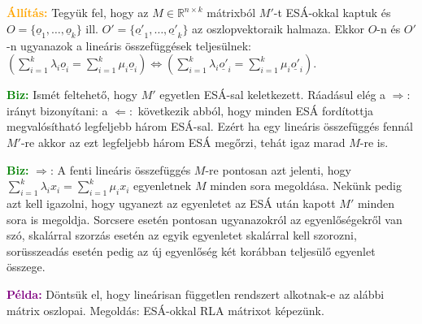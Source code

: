 \documentclass[../szamtud.tex]{subfiles}
\begin{document}
        \textcolor{orange}{\textbf{Állítás:}} Tegyük fel, hogy az $M \in \mathbb{R}^{n \times k}$ mátrixból $M'$-t ESÁ-okkal kaptuk és $O = \{\underline{o}_1, \dots, \underline{o}_k\}$ ill. $O' = \{\underline{o'}_1, \dots, \underline{o'}_k\}$ az oszlopvektoraik halmaza. Ekkor $O$-n és $O'$-n ugyanazok a lineáris összefüggések teljesülnek: $(\sum_{i=1}^{k}\lambda_i \underline{o}_i= \sum_{i=1}^{k}\mu_i \underline{o}_i) \Longleftrightarrow (\sum_{i=1}^{k}\lambda_i \underline{o'}_i= \sum_{i=1}^{k}\mu_i \underline{o'}_i)$.

        \textcolor{green}{\textbf{Biz:}} Ismét feltehető, hogy $M'$ egyetlen ESÁ-sal keletkezett. Ráadásul elég a $\Rightarrow:$ irányt bizonyítani: a $\Leftarrow:$ következik abból, hogy minden ESÁ fordítottja megvalósítható legfeljebb három ESÁ-sal. Ezért ha egy lineáris összefüggés fennál $M'$-re akkor az ezt legfeljebb három ESÁ megőrzi, tehát igaz marad $M$-re is.

        \textcolor{green}{\textbf{Biz:}} $\Rightarrow$: A fenti lineáris összefüggés $M$-re pontosan azt jelenti, hogy $\sum_{i=1}^{k}\lambda_i x_i = \sum_{i=1}^{k}\mu_i x_i$ egyenletnek $M$ minden sora megoldása. Nekünk pedig azt kell igazolni, hogy ugyanezt az egyenletet az ESÁ után kapott $M'$ minden sora is megoldja. Sorcsere esetén pontosan ugyanazokról az egyenlőségekről van szó, skalárral szorzás esetén az egyik egyenletet skalárral kell szorozni, sorüsszeadás esetén pedig az új egyenlőség két korábban teljesülő egyenlet összege.

        \textcolor{purple}{\textbf{Példa:}} Döntsük el, hogy lineárisan független rendszert alkotnak-e az alábbi mátrix oszlopai. Megoldás: ESÁ-okkal RLA mátrixot képezünk.
\end{document}

